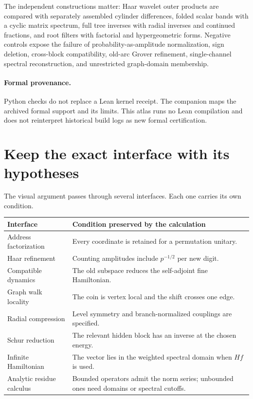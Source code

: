 The independent constructions matter: Haar wavelet outer products are compared with separately assembled cylinder differences, folded scalar bands with a cyclic matrix spectrum, full tree inverses with radial inverses and continued fractions, and root filters with factorial and hypergeometric forms. Negative controls expose the failure of probability-as-amplitude normalization, sign deletion, cross-block compatibility, old-arc Grover refinement, single-channel spectral reconstruction, and unrestricted graph-domain membership.

\paragraph{Formal provenance.}
Python checks do not replace a Lean kernel receipt. The companion maps the archived formal support and its limits. This atlas runs no Lean compilation and does not reinterpret historical build logs as new formal certification.

\clearpage
\section{Keep the exact interface with its hypotheses}

The visual argument passes through several interfaces. Each one carries its own condition.

\begin{center}
\begin{tabularx}{\linewidth}{@{}L{.24\linewidth}X@{}}
\toprule
Interface & Condition preserved by the calculation \\
\midrule
Address factorization & Every coordinate is retained for a permutation unitary. \\
Haar refinement & Counting amplitudes include $p^{-1/2}$ per new digit. \\
Compatible dynamics & The old subspace reduces the self-adjoint fine Hamiltonian. \\
Graph walk locality & The coin is vertex local and the shift crosses one edge. \\
Radial compression & Level symmetry and branch-normalized couplings are specified. \\
Schur reduction & The relevant hidden block has an inverse at the chosen energy. \\
Infinite Hamiltonian & The vector lies in the weighted spectral domain when $Hf$ is used. \\
Analytic residue calculus & Bounded operators admit the norm series; unbounded ones need domains or spectral cutoffs. \\
\bottomrule
\end{tabularx}
\end{center}


